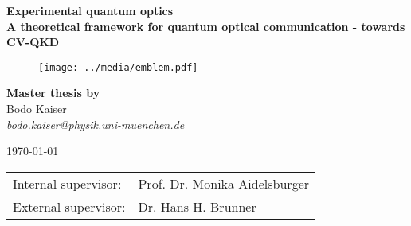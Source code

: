 \makeatletter
\begin{titlepage}
	\begin{center}
		\large
		    \textbf{\textsf{Experimental quantum optics}}\\
	    \vspace{0.8em}
		\huge
	    \textbf{\textsf{A theoretical framework for quantum optical communication - towards  CV-QKD}}\\
		
		\vspace{1.2em}
		\begin{figure}[htb]
			\centering
			\texttt{[image: ../media/emblem.pdf]}
		\end{figure}
		
		\vspace{.6em}
	    \large
	    \textbf{Master thesis by}\\
		\vspace{.8em}
	    \large
		Bodo Kaiser\\
	    \vspace{.2em}
		\textit{bodo.kaiser@physik.uni-muenchen.de}

	    \large
	    \today

	    \vspace{1.9em}
		\normalsize
		\begin{tabular}{ll}
		Internal supervisor: & Prof. Dr. Monika Aidelsburger \\
		External supervisor: & Dr. Hans H. Brunner \\
		\end{tabular}
	\end{center}
\end{titlepage}
\makeatother

